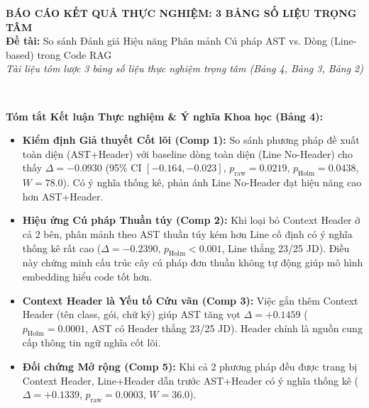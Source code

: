 \documentclass[11pt,a4paper,landscape]{article}
\begin{document}

\begin{center}
{\Large\textbf{BÁO CÁO KẾT QUẢ THỰC NGHIỆM: 3 BẢNG SỐ LIỆU TRỌNG TÂM}}\\[0.12cm]
{\large\textbf{Đề tài:} So sánh Đánh giá Hiệu năng Phân mảnh Cú pháp AST vs. Dòng (Line-based) trong Code RAG}\\[0.08cm]
{\normalsize\textit{Tài liệu tóm lược 3 bảng số liệu thực nghiệm trọng tâm (Bảng 4, Bảng 3, Bảng 2)}}
\end{center}
\vspace{-0.1cm}

\\[0.05cm]

\vspace{-0.1cm}
{\small
\noindent\textbf{Tóm tắt Kết luận Thực nghiệm \& Ý nghĩa Khoa học (Bảng 4):}
\begin{itemize}[nosep,topsep=2pt,partopsep=0pt,itemsep=2pt]
    \item \textbf{Kiểm định Giả thuyết Cốt lõi (Comp 1):} So sánh phương pháp đề xuất toàn diện (AST+Header) với baseline dòng toàn diện (Line No-Header) cho thấy $\Delta = -0.0930$ (95\% CI $[-0.164, -0.023]$, $p_{\mathrm{raw}} = 0.0219$, $p_{\mathrm{Holm}} = 0.0438$, $W = 78.0$). Có ý nghĩa thống kê, phản ánh Line No-Header đạt hiệu năng cao hơn AST+Header.
    \item \textbf{Hiệu ứng Cú pháp Thuần túy (Comp 2):} Khi loại bỏ Context Header ở cả 2 bên, phân mảnh theo AST thuần túy kém hơn Line cố định có ý nghĩa thống kê rất cao ($\Delta = -0.2390$, $p_{\mathrm{Holm}} < 0.001$, Line thắng 23/25 JD). Điều này chứng minh cấu trúc cây cú pháp đơn thuần không tự động giúp mô hình embedding hiểu code tốt hơn.
    \item \textbf{Context Header là Yếu tố Cứu vãn (Comp 3):} Việc gắn thêm Context Header (tên class, gói, chữ ký) giúp AST tăng vọt $\Delta = +0.1459$ ($p_{\mathrm{Holm}} = 0.0001$, AST có Header thắng 23/25 JD). Header chính là nguồn cung cấp thông tin ngữ nghĩa cốt lõi.
    \item \textbf{Đối chứng Mở rộng (Comp 5):} Khi cả 2 phương pháp đều được trang bị Context Header, Line+Header dẫn trước AST+Header có ý nghĩa thống kê ($\Delta = +0.1339$, $p_{\mathrm{raw}} = 0.0003$, $W = 36.0$).
\end{itemize}
}
\clearpage
\end{document}

